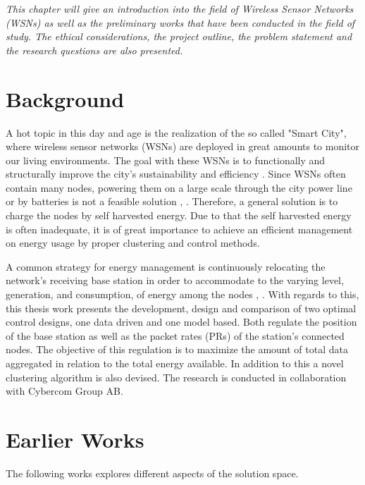 \textit{This chapter will give an introduction into the field of Wireless Sensor Networks (WSNs) as well as the preliminary works that have been conducted in the field of study. The ethical considerations, the project outline, the problem statement and the research questions are also presented.}

\section{Background}

\noindent A hot topic in this day and age is the realization of the so called "Smart City", where wireless sensor networks (WSNs) are deployed in great amounts to monitor our living environments. The goal with these WSNs is to functionally and structurally improve the city’s sustainability and efficiency \cite{liu2017rf}. Since WSNs often contain many nodes, powering them on a large scale through the city power line or by batteries is not a feasible solution \cite{ruan2017energy}, \cite{ImportanceMitcheson2008energy}. Therefore, a general solution is to charge the nodes by self harvested energy. Due to that the self harvested energy is often inadequate, it is of great importance to achieve an efficient management on energy usage by proper clustering and control methods.\newline

\noindent A common strategy for energy management  is continuously relocating the network's receiving base station in order to accommodate to the varying level, generation, and consumption, of energy among the nodes \cite{torghabeh2010mobile}, \cite{heinzelman2000energy}. With regards to this, this thesis work presents the development, design and comparison of two optimal control designs, one data driven and one model based. Both regulate the position of the base station as well as the packet rates (PRs) of the station's connected nodes. The objective of this regulation is to maximize the amount of total data aggregated in relation to the total energy available. In addition to this a novel clustering algorithm is also devised. The research is conducted in collaboration with Cybercom Group AB.

\section{Earlier Works}
\label{ss:EarlierWorks}
\noindent The following works explores different aspects of the solution space. 

